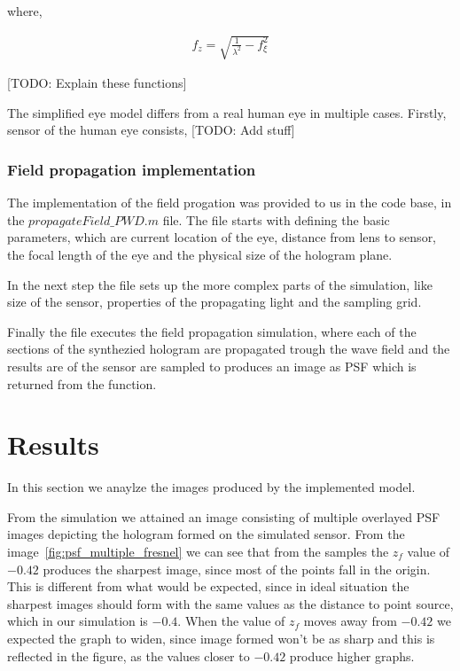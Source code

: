 \documentclass[12pt,a4paper,english
]{tunithesis}
\begin{document}
where,

\begin{align}
  \label{eq:focus}
  f_z = \sqrt{\frac{1}{\lambda^2} - f_\xi ^ 2}
\end{align}

[TODO: Explain these functions]

The simplified eye model differs from a real human eye in multiple cases. Firstly, sensor of the human eye consists, [TODO: Add stuff]

\subsection{Field propagation implementation}
The implementation of the field progation was provided to us in the code base, in the $propagateField\_PWD.m$ file. The file starts with defining the basic parameters, which are current location of the eye, distance from lens to sensor, the focal length of the eye and the physical size of the hologram plane.

In the next step the file sets up the more complex parts of the simulation, like size of the sensor, properties of the propagating light and the sampling grid.

Finally the file executes the field propagation simulation, where each of the sections of the synthezied hologram are propagated trough the wave field and the results are of the sensor are sampled to produces an image as PSF which is returned from the function.


\chapter{Results}
\label{sec:results}
In this section we anaylze the images produced by the implemented model.

From the simulation we attained an image consisting of multiple overlayed PSF images depicting the hologram formed on the simulated sensor. From the image~\ref{fig:psf_multiple_fresnel} we can see that from the samples the $z_f$ value of $-0.42$ produces the sharpest image, since most of the points fall in the origin. This is different from what would be expected, since in ideal situation the sharpest images should form with the same values as the distance to point source, which in our simulation is $-0.4$. When the value of $z_f$ moves away from $-0.42$ we expected the graph to widen, since image formed won't be as sharp and this is reflected in the figure, as the values closer to $-0.42$ produce higher graphs.
\end{document}
